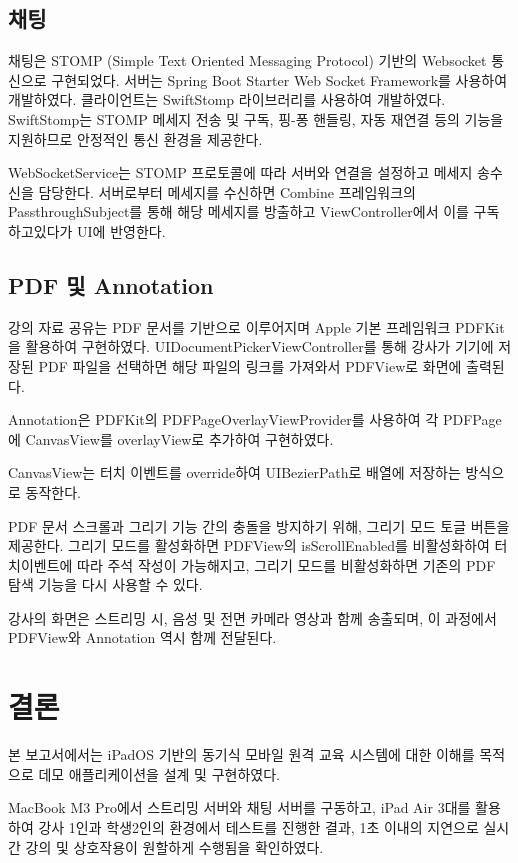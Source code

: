 \documentclass[a4paper]{article}
\begin{document}
\subsection{채팅}
채팅은 STOMP (Simple Text Oriented Messaging Protocol) 기반의 Websocket 통신으로 구현되었다.
서버는 Spring Boot Starter Web Socket Framework를 사용하여 개발하였다.
클라이언트는 SwiftStomp\cite{SwiftStomp} 라이브러리를 사용하여 개발하였다. SwiftStomp는 STOMP 메세지 전송 및 구독, 핑-퐁 핸들링, 자동 재연결 등의 기능을 지원하므로 안정적인 통신 환경을 제공한다.

WebSocketService는 STOMP 프로토콜에 따라 서버와 연결을 설정하고 메세지 송수신을 담당한다. 서버로부터 메세지를 수신하면 Combine 프레임워크의 PassthroughSubject를 통해 해당 메세지를 방출하고 ViewController에서 이를 구독하고있다가 UI에 반영한다.

\subsection{PDF 및 Annotation}
강의 자료 공유는 PDF 문서를 기반으로 이루어지며 Apple 기본 프레임워크 PDFKit을 활용하여 구현하였다. UIDocumentPickerViewController를 통해 강사가 기기에 저장된 PDF 파일을 선택하면 해당 파일의 링크를 가져와서 PDFView로 화면에 출력된다.

Annotation은 PDFKit의 PDFPageOverlayViewProvider를 사용하여 각 PDFPage에 CanvasView를 overlayView로 추가하여 구현하였다.

CanvasView는 터치 이벤트를 override하여 UIBezierPath로 배열에 저장하는 방식으로 동작한다.

PDF 문서 스크롤과 그리기 기능 간의 충돌을 방지하기 위해, 그리기 모드 토글 버튼을 제공한다. 그리기 모드를 활성화하면 PDFView의 isScrollEnabled를 비활성화하여 터치이벤트에 따라 주석 작성이 가능해지고, 그리기 모드를 비활성화하면 기존의 PDF 탐색 기능을 다시 사용할 수 있다.

강사의 화면은 스트리밍 시, 음성 및 전면 카메라 영상과 함께 송출되며, 이 과정에서 PDFView와 Annotation 역시 함께 전달된다.

\section{결론}
본 보고서에서는 iPadOS 기반의 동기식 모바일 원격 교육 시스템에 대한 이해를 목적으로 데모 애플리케이션을 설계 및 구현하였다.

MacBook M3 Pro에서 스트리밍 서버와 채팅 서버를 구동하고, iPad Air 3대를 활용하여 강사 1인과 학생2인의 환경에서 테스트를 진행한 결과, 1초 이내의 지연으로 실시간 강의 및 상호작용이 원할하게 수행됨을 확인하였다.
\end{document}
